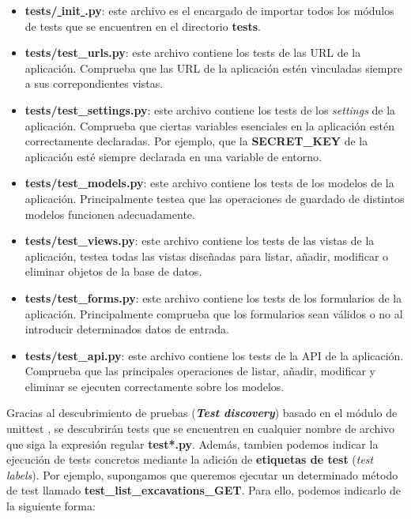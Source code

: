     \begin{itemize}
        \item \textbf{tests/\underline{  }init\underline{  }.py}: este archivo es el
        encargado de importar todos los módulos de tests que se encuentren en el
        directorio \textbf{tests}.
        \item \textbf{tests/test\_urls.py}: este archivo contiene los tests de las URL de la
        aplicación. Comprueba que las URL de la aplicación estén vinculadas siempre a sus
        correpondientes vistas.
        \item \textbf{tests/test\_settings.py}: este archivo contiene los tests de los
        \textit{settings} de la aplicación. Comprueba que ciertas variables esenciales en
        la aplicación estén correctamente declaradas. Por ejemplo, que la
        \textbf{SECRET\_KEY} de la aplicación esté siempre declarada en una variable de
        entorno.
        \item \textbf{tests/test\_models.py}: este archivo contiene los tests de los modelos
        de la aplicación. Principalmente testea que las operaciones de guardado de distintos
        modelos funcionen adecuadamente.
        \item \textbf{tests/test\_views.py}: este archivo contiene los tests de las vistas
        de la aplicación, testea todas las vistas diseñadas para listar, añadir, modificar o
        eliminar objetos de la base de datos.
        \item \textbf{tests/test\_forms.py}: este archivo contiene los tests de los formularios
        de la aplicación. Principalmente comprueba que los formularios sean válidos o no
        al introducir determinados datos de entrada.
        \item \textbf{tests/test\_api.py}: este archivo contiene los tests de la API de la
        aplicación. Comprueba que las principales operaciones de listar, añadir, modificar y
        eliminar se ejecuten correctamente sobre los modelos.
    \end{itemize}

Gracias al descubrimiento de pruebas (\textbf{\textit{Test discovery}}) basado en el módulo
de unittest \cite{test-discovery}, se descubrirán tests que se encuentren en cualquier nombre
de archivo que siga la expresión regular \textbf{test*.py}. Además, tambien podemos indicar
la ejecución de tests concretos mediante la adición de \textbf{etiquetas de test}
(\textit{test labels}). Por ejemplo, supongamos que queremos ejecutar un determinado método
de test llamado \textbf{test\_list\_excavations\_GET}. Para ello, podemos indicarlo de la
siguiente forma:

